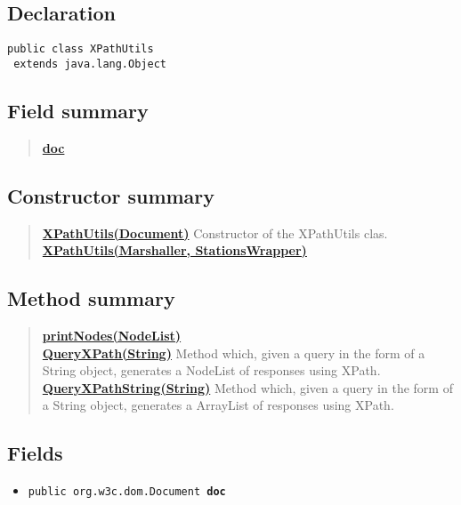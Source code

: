 \documentclass[11pt,a4paper]{report}
\begin{document}
{{{\subsection{Declaration}{
\begin{lstlisting}[frame=none]
public class XPathUtils
 extends java.lang.Object\end{lstlisting}
\subsection{Field summary}{
\begin{verse}
\hyperlink{parsers.XPathUtils.doc}{{\bf doc}} \\
\end{verse}
}
\subsection{Constructor summary}{
\begin{verse}
\hyperlink{parsers.XPathUtils(org.w3c.dom.Document)}{{\bf XPathUtils(Document)}} Constructor of the XPathUtils clas.\\
\hyperlink{parsers.XPathUtils(javax.xml.bind.Marshaller, models.StationsWrapper)}{{\bf XPathUtils(Marshaller, StationsWrapper)}} \\
\end{verse}
}
\subsection{Method summary}{
\begin{verse}
\hyperlink{parsers.XPathUtils.printNodes(org.w3c.dom.NodeList)}{{\bf printNodes(NodeList)}} \\
\hyperlink{parsers.XPathUtils.QueryXPath(java.lang.String)}{{\bf QueryXPath(String)}} Method which, given a query in the form of a String object, generates a NodeList of responses using XPath.\\
\hyperlink{parsers.XPathUtils.QueryXPathString(java.lang.String)}{{\bf QueryXPathString(String)}} Method which, given a query in the form of a String object, generates a ArrayList of responses using XPath.\\
\end{verse}
}
\subsection{Fields}{
\begin{itemize}
\item{
\label{parsers.XPathUtils.doc}\hypertarget{parsers.XPathUtils.doc}{\texttt{public org.w3c.dom.Document\ {\bf  doc}}
}
}
\end{itemize}
}
}}}}
\end{document}

